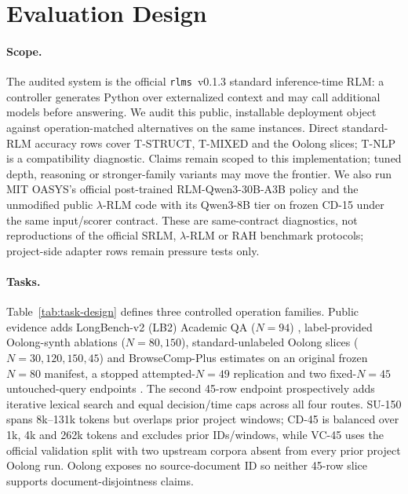 \documentclass[letterpaper]{article}
\begin{document}
\section{Evaluation Design}

\paragraph{Scope.}
The audited system is the official \texttt{rlms}~v0.1.3 standard inference-time RLM: a controller generates Python over externalized context and may call additional models before answering. We audit this public, installable deployment object against operation-matched alternatives on the same instances. Direct standard-RLM accuracy rows cover T-STRUCT, T-MIXED and the Oolong slices; T-NLP is a compatibility diagnostic. Claims remain scoped to this implementation; tuned depth, reasoning or stronger-family variants may move the frontier. We also run MIT OASYS's official post-trained RLM-Qwen3-30B-A3B policy and the unmodified public $\lambda$-RLM code with its Qwen3-8B tier on frozen CD-15 under the same input/scorer contract. These are same-contract diagnostics, not reproductions of the official SRLM, $\lambda$-RLM or RAH benchmark protocols; project-side adapter rows remain pressure tests only.

\paragraph{Tasks.}
Table~\ref{tab:task-design} defines three controlled operation families. Public evidence adds LongBench-v2 (LB2) Academic QA ($N{=}94$) \citep{bai2025longbenchv2}, label-provided Oolong-synth ablations ($N{=}80,150$), standard-unlabeled Oolong slices ($N{=}30,120,150,45$) and BrowseComp-Plus estimates on an original frozen $N{=}80$ manifest, a stopped attempted-$N{=}49$ replication and two fixed-$N{=}45$ untouched-query endpoints \citep{chen2025BrowseCompPlus}. The second 45-row endpoint prospectively adds iterative lexical search and equal decision/time caps across all four routes. SU-150 spans 8k--131k tokens but overlaps prior project windows; CD-45 is balanced over 1k, 4k and 262k tokens and excludes prior IDs/windows, while VC-45 uses the official validation split with two upstream corpora absent from every prior project Oolong run. Oolong exposes no source-document ID so neither 45-row slice supports document-disjointness claims.
\end{document}

